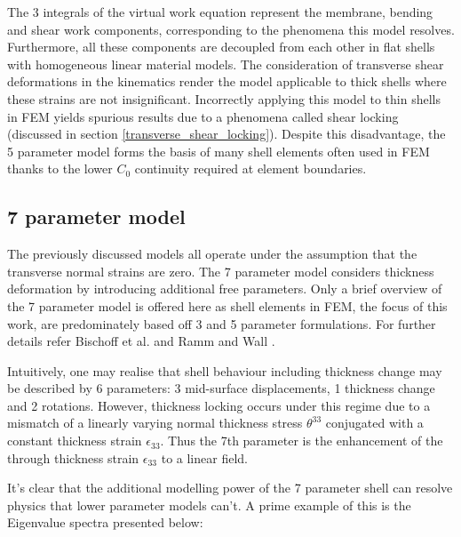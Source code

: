 The 3 integrals of the virtual work equation represent the membrane, bending and shear work components, corresponding to the phenomena this model resolves. Furthermore, all these components are decoupled from each other in flat shells with homogeneous linear material models. The consideration of transverse shear deformations in the kinematics render the model applicable to thick shells where these strains are not insignificant. Incorrectly applying this model to thin shells in FEM yields spurious results due to a phenomena called shear locking (discussed in section \ref{transverse_shear_locking}). Despite this disadvantage, the 5 parameter model forms the basis of many shell elements often used in FEM thanks to the lower $C_0$ continuity required at element boundaries.

\subsection{7 parameter model}

The previously discussed models all operate under the assumption that the transverse normal strains are zero. The 7 parameter model considers thickness deformation by introducing additional free parameters. Only a brief overview of the 7 parameter model is offered here as shell elements in FEM, the focus of this work, are predominately based off 3 and 5 parameter formulations. For further details refer Bischoff et al. \cite{BischLitBook04} and Ramm and Wall \cite{RammLitBook04}.

Intuitively, one may realise that shell behaviour including thickness change may be described by 6 parameters:  3 mid-surface displacements, 1 thickness change and 2 rotations.  However, thickness locking occurs under this regime due to a mismatch of a linearly varying normal thickness stress $\theta^{33}$ conjugated with a constant thickness strain $\epsilon_{33}$. Thus the 7th parameter is the enhancement of the through thickness strain $\epsilon_{33}$ to a linear field.

It's clear that the additional modelling power of the 7 parameter shell can resolve physics that lower parameter models can't. A prime example of this is the Eigenvalue spectra presented below:

